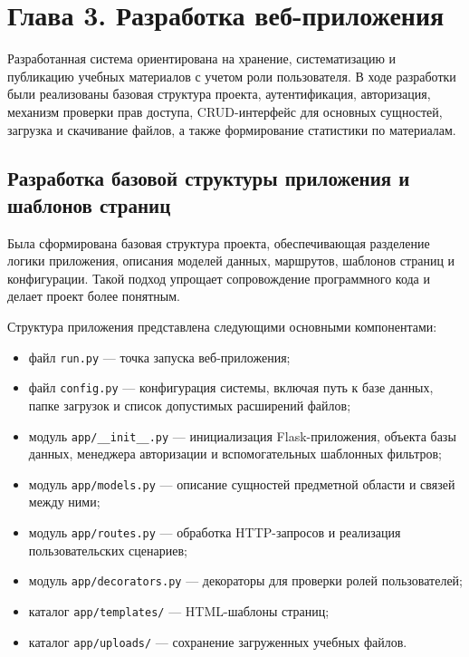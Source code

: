 \section*{Глава 3. Разработка веб-приложения}

Разработанная система ориентирована на хранение, систематизацию и публикацию учебных материалов с учетом роли пользователя. В ходе разработки были реализованы базовая структура проекта, аутентификация, авторизация, механизм проверки прав доступа, CRUD-интерфейс для основных сущностей, загрузка и скачивание файлов, а также формирование статистики по материалам.

\subsection{Разработка базовой структуры приложения и шаблонов страниц}

Была сформирована базовая структура проекта, обеспечивающая разделение логики приложения, описания моделей данных, маршрутов, шаблонов страниц и конфигурации. Такой подход упрощает сопровождение программного кода и делает проект более понятным.

Структура приложения представлена следующими основными компонентами:

\begin{itemize}[leftmargin=1.25cm]
    \item файл \texttt{run.py} --- точка запуска веб-приложения;
    \item файл \texttt{config.py} --- конфигурация системы, включая путь к базе данных, папке загрузок и список допустимых расширений файлов;
    \item модуль \texttt{app/\_\_init\_\_.py} --- инициализация Flask-приложения, объекта базы данных, менеджера авторизации и вспомогательных шаблонных фильтров;
    \item модуль \texttt{app/models.py} --- описание сущностей предметной области и связей между ними;
    \item модуль \texttt{app/routes.py} --- обработка HTTP-запросов и реализация пользовательских сценариев;
    \item модуль \texttt{app/decorators.py} --- декораторы для проверки ролей пользователей;
    \item каталог \texttt{app/templates/} --- HTML-шаблоны страниц;
    \item каталог \texttt{app/uploads/} --- сохранение загруженных учебных файлов.
\end{itemize}

